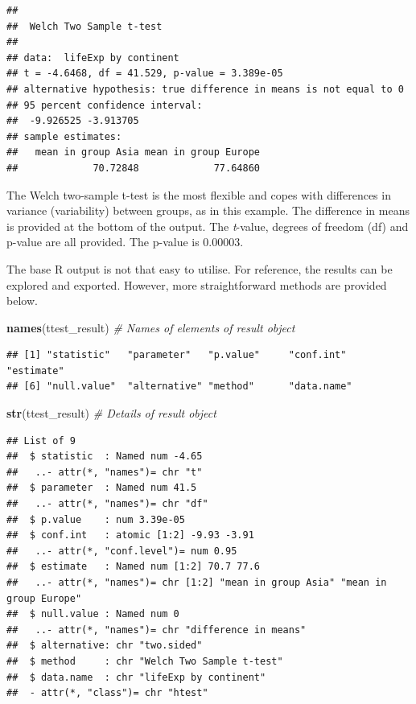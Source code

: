 \documentclass[12pt,]{krantz}
\makeatletter
\newenvironment{Shaded}{\begin{snugshade}}{\end{snugshade}}
\newcommand{\CommentTok}[1]{\textcolor[rgb]{0.56,0.35,0.01}{\textit{#1}}}
\newcommand{\KeywordTok}[1]{\textcolor[rgb]{0.13,0.29,0.53}{\textbf{#1}}}
\newcommand{\NormalTok}[1]{#1}
\newenvironment{kframe}{%
\medskip{}
\setlength{\fboxsep}{.8em}
 \def\at@end@of@kframe{}%
 \ifinner\ifhmode%
  \def\at@end@of@kframe{\end{minipage}}%
  \begin{minipage}{\columnwidth}%
 \fi\fi%
 \def\FrameCommand##1{\hskip\@totalleftmargin \hskip-\fboxsep
 \colorbox{shadecolor}{##1}\hskip-\fboxsep
     \hskip-\linewidth \hskip-\@totalleftmargin \hskip\columnwidth}%
 \MakeFramed {\advance\hsize-\width
   \@totalleftmargin\z@ \linewidth\hsize
   \@setminipage}}%
 {\par\unskip\endMakeFramed%
 \at@end@of@kframe}
\renewenvironment{Shaded}{\begin{kframe}}{\end{kframe}}
\theoremstyle{definition}
\theoremstyle{definition}
\theoremstyle{definition}
\theoremstyle{remark}
\makeatother
\begin{document}
\begin{verbatim}
## 
##  Welch Two Sample t-test
## 
## data:  lifeExp by continent
## t = -4.6468, df = 41.529, p-value = 3.389e-05
## alternative hypothesis: true difference in means is not equal to 0
## 95 percent confidence interval:
##  -9.926525 -3.913705
## sample estimates:
##   mean in group Asia mean in group Europe 
##             70.72848             77.64860
\end{verbatim}

 

The Welch two-sample t-test is the most flexible and copes with
differences in variance (variability) between groups, as in this
example. The difference in means is provided at the bottom of the
output. The \emph{t}-value, degrees of freedom (df) and p-value are all
provided. The p-value is 0.00003.

The base R output is not that easy to utilise. For reference, the
results can be explored and exported. However, more straightforward
methods are provided below.

\begin{Shaded}
\begin{Highlighting}[]
\KeywordTok{names}\NormalTok{(ttest_result)  }\CommentTok{# Names of elements of result object}
\end{Highlighting}
\end{Shaded}

\begin{verbatim}
## [1] "statistic"   "parameter"   "p.value"     "conf.int"    "estimate"   
## [6] "null.value"  "alternative" "method"      "data.name"
\end{verbatim}

\begin{Shaded}
\begin{Highlighting}[]
\KeywordTok{str}\NormalTok{(ttest_result)    }\CommentTok{# Details of result object}
\end{Highlighting}
\end{Shaded}

\begin{verbatim}
## List of 9
##  $ statistic  : Named num -4.65
##   ..- attr(*, "names")= chr "t"
##  $ parameter  : Named num 41.5
##   ..- attr(*, "names")= chr "df"
##  $ p.value    : num 3.39e-05
##  $ conf.int   : atomic [1:2] -9.93 -3.91
##   ..- attr(*, "conf.level")= num 0.95
##  $ estimate   : Named num [1:2] 70.7 77.6
##   ..- attr(*, "names")= chr [1:2] "mean in group Asia" "mean in group Europe"
##  $ null.value : Named num 0
##   ..- attr(*, "names")= chr "difference in means"
##  $ alternative: chr "two.sided"
##  $ method     : chr "Welch Two Sample t-test"
##  $ data.name  : chr "lifeExp by continent"
##  - attr(*, "class")= chr "htest"
\end{verbatim}
\end{document}

